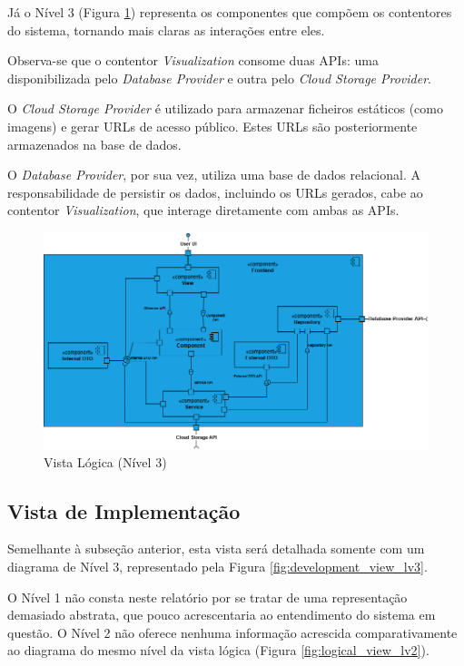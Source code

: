 Já o Nível 3 (Figura \ref{fig:logical_view_lv3}) representa os componentes que compõem os contentores do sistema, tornando mais claras as interações entre eles.

Observa-se que o contentor \textit{Visualization} consome duas APIs: uma disponibilizada pelo \textit{Database Provider} e outra pelo \textit{Cloud Storage Provider}.

O \textit{Cloud Storage Provider} é utilizado para armazenar ficheiros estáticos (como imagens) e gerar URLs de acesso público. Estes URLs são posteriormente armazenados na base de dados.

O \textit{Database Provider}, por sua vez, utiliza uma base de dados relacional. A responsabilidade de persistir os dados, incluindo os URLs gerados, cabe ao contentor \textit{Visualization}, que interage diretamente com ambas as APIs.

\begin{landscape}
\begin{figure}[p]
    \centering
    \includegraphics[width=\linewidth,keepaspectratio]{frontmatter/assets/diagrams/Logical View/Logical View Lv3.drawio.png}
    \caption{Vista Lógica (Nível 3)}
    \label{fig:logical_view_lv3}
\end{figure}
\end{landscape}

\subsection{Vista de Implementação}

Semelhante à subseção anterior, esta vista será detalhada somente com um diagrama de Nível 3, representado pela Figura \ref{fig:development_view_lv3}.

O Nível 1 não consta neste relatório por se tratar de uma representação demasiado abstrata, que pouco acrescentaria ao entendimento do sistema em questão. O Nível 2 não oferece nenhuma informação acrescida comparativamente ao diagrama do mesmo nível da vista lógica (Figura \ref{fig:logical_view_lv2}).

